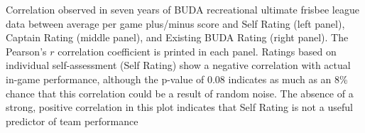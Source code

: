 Correlation observed in seven years of BUDA recreational ultimate frisbee league data between average per game plus/minus score and Self Rating (left panel), Captain Rating (middle panel), and Existing BUDA Rating (right panel).  The Pearson's $r$ correlation coefficient is printed in each panel. Ratings based on individual self-assessment (Self Rating) show a negative correlation with actual in-game performance, although the p-value of 0.08 indicates as much as an 8\% chance that this correlation could be a result of random noise. The absence of a strong, positive correlation in this plot indicates that Self Rating is not a useful predictor of team performance